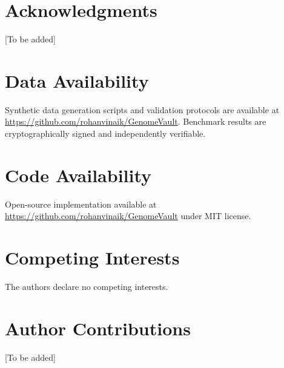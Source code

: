 \documentclass[11pt,letterpaper]{article}
\begin{document}
\section*{Acknowledgments}

[To be added]

\section*{Data Availability}

Synthetic data generation scripts and validation protocols are available at \url{https://github.com/rohanvinaik/GenomeVault}. Benchmark results are cryptographically signed and independently verifiable.

\section*{Code Availability}

Open-source implementation available at \url{https://github.com/rohanvinaik/GenomeVault} under MIT license.

\section*{Competing Interests}

The authors declare no competing interests.

\section*{Author Contributions}

[To be added]
\end{document}
